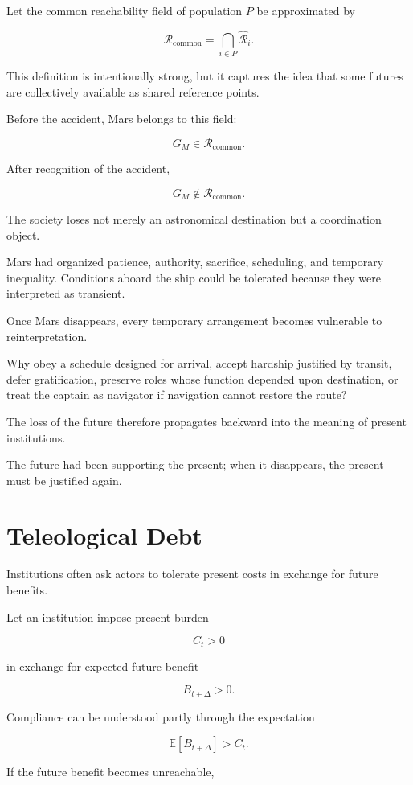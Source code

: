 \documentclass[11pt,oneside]{book}
\theoremstyle{definition}
\theoremstyle{remark}
\newcommand{\R}{\mathcal{R}}
\begin{document}
Let the common reachability field of population \(P\) be approximated by

\[
\R_{\mathrm{common}}
=
\bigcap_{i\in P}
\widehat{\R}_i.
\]

This definition is intentionally strong, but it captures the idea that some futures are collectively available as shared reference points.

Before the accident, Mars belongs to this field:

\[
G_M\in\R_{\mathrm{common}}.
\]

After recognition of the accident,

\[
G_M\notin\R_{\mathrm{common}}.
\]

The society loses not merely an astronomical destination but a coordination object.

Mars had organized patience, authority, sacrifice, scheduling, and temporary inequality. Conditions aboard the ship could be tolerated because they were interpreted as transient.

Once Mars disappears, every temporary arrangement becomes vulnerable to reinterpretation.

Why obey a schedule designed for arrival, accept hardship justified by transit, defer gratification, preserve roles whose function depended upon destination, or treat the captain as navigator if navigation cannot restore the route?

The loss of the future therefore propagates backward into the meaning of present institutions.

The future had been supporting the present; when it disappears, the present must be justified again.

\section{Teleological Debt}

Institutions often ask actors to tolerate present costs in exchange for future benefits.

Let an institution impose present burden

\[
C_t>0
\]

in exchange for expected future benefit

\[
B_{t+\Delta}>0.
\]

Compliance can be understood partly through the expectation

\[
\mathbb E[B_{t+\Delta}]
>
C_t.
\]

If the future benefit becomes unreachable,
\end{document}
